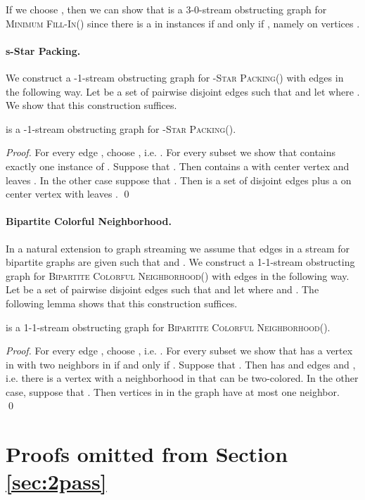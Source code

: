 \documentclass[draft,a4paper]{llncs}
\newcommand{\MFIk}{\textsc{Minimum Fill-In()}\xspace}
\newcommand{\BCNk}{\textsc{Bipartite Colorful Neighborhood()}\xspace}
\newcommand{\sSPk}{-\textsc{Star Packing()}\xspace}
\begin{document}
If we choose , then we can show that  is a 3-0-stream obstructing graph  for \MFIk since there is a  in instances  if and only if , namely on vertices .

\paragraph{s-Star Packing.}
We construct a -1-stream obstructing graph  for \sSPk with  edges in the following way. Let  be a set of pairwise disjoint edges such that  and let  where . We show that this construction suffices.

\begin{lemma}
  is a -1-stream obstructing graph for \sSPk.
\end{lemma}

\begin{proof}
For every edge , choose , i.e. . For every subset  we show that  contains exactly one instance of . Suppose that . Then  contains a  with center vertex  and leaves . In the other case suppose that . Then  is a set of disjoint edges plus a  on center vertex  with leaves . \qed
\end{proof}

\paragraph{Bipartite Colorful Neighborhood.}
In a natural extension to graph streaming we assume that edges  in a stream for bipartite graphs  are given such that  and . We construct a 1-1-stream obstructing graph  for \BCNk with  edges in the following way. Let  be a set of pairwise disjoint edges such that  and let  where  and . The following lemma shows that this construction suffices.

\begin{lemma}
  is a 1-1-stream obstructing graph for \BCNk.
\end{lemma}

\begin{proof}
 For every edge , choose , i.e. . For every subset  we show that  has a vertex in  with two neighbors in  if and only if . Suppose that . Then  has  and edges  and , i.e. there is a vertex  with a neighborhood in  that can be two-colored. In the other case, suppose that . Then vertices in  in the graph  have at most one neighbor.
 \qed
\end{proof}

\section{Proofs omitted from Section \ref{sec:2pass}}
\end{document}
